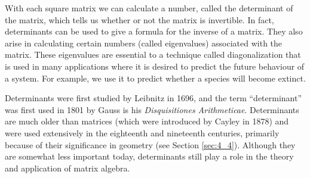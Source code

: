 \noindent With each square matrix we can calculate a number, called the determinant of the matrix, which tells us whether or not the matrix is invertible. In fact, determinants can be used to give a formula for the inverse of a matrix. They also arise in calculating certain numbers (called eigenvalues) associated with the matrix. These eigenvalues are essential to a technique called diagonalization that is used in many applications where it is desired to predict the future behaviour of a system. For example, we use it to predict whether a species will become extinct. 

Determinants were first studied by Leibnitz in 1696, and the term ``determinant'' was first used in 1801 by Gauss is his \textit{Disquisitiones Arithmeticae}. Determinants are much older than matrices (which were introduced by Cayley in 1878) and were used extensively in the eighteenth and nineteenth centuries, primarily because of their significance in geometry (see Section \ref{sec:4_4}). Although they are somewhat less important today, determinants still play a role in the theory and application of matrix algebra. 
